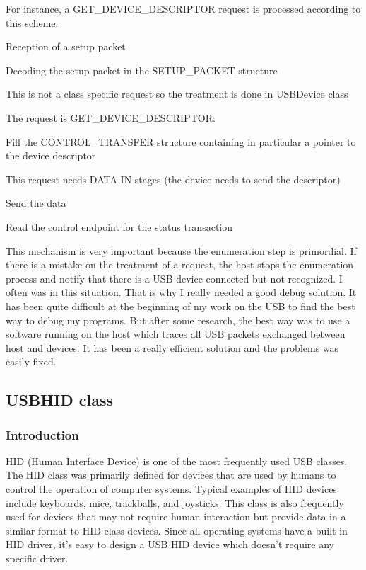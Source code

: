 \documentclass[pdftex,10pt,a4paper]{report}
\newenvironment{packed_item}{
\begin{itemize}
  \setlength{\itemsep}{1pt}
  \setlength{\parskip}{0pt}
  \setlength{\parsep}{0pt}
}{\end{itemize}}
\begin{document}
For instance, a GET\_DEVICE\_DESCRIPTOR request is processed according to this scheme:
\begin{packed_item}
	\item Reception of a setup packet
	\item Decoding the setup packet in the SETUP\_PACKET structure
	\item This is not a class specific request so the treatment is done in USBDevice class
	\item The request is GET\_DEVICE\_DESCRIPTOR:
	\begin{packed_item}
		\item Fill the CONTROL\_TRANSFER structure containing in particular a pointer to the device descriptor
		\item This request needs DATA IN stages (the device needs to send the descriptor)
		\item Send the data
		\item Read the control endpoint for the status transaction
	\end{packed_item}
\end{packed_item}

This mechanism is very important because the enumeration step is primordial. If there is a mistake on the treatment of a request, the host stops the enumeration process and notify that there is a USB device connected but not recognized. I often was in this situation. That is why I really needed a good debug solution. It has been quite difficult at the beginning of my work on the USB to find the best way to debug my programs. But after some research, the best way was to use a software running on the host which traces all USB packets exchanged between host and devices. It has been a really efficient solution and the problems was easily fixed.


\subsection{USBHID class}
\subsubsection{Introduction}
HID (Human Interface Device) is one of the most frequently used USB classes. The HID class was primarily defined for devices that are used by humans to control the operation of computer systems. Typical examples of HID devices include keyboards, mice, trackballs, and joysticks. This class is also frequently used for devices that may not require human interaction but provide data in a similar format to HID class devices. Since all operating systems have a built-in HID driver, it's easy to design a USB HID device which doesn't require any specific driver. \\
\end{document}
